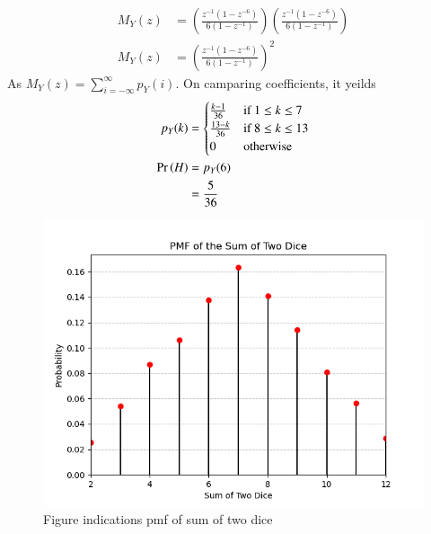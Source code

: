 \documentclass[journal,12pt,twocolumn]{IEEEtran}
\theoremstyle{remark}
\begin{document}
\begin{enumerate}
\begin{align}
M_Y(z)&= \left( \frac{z^{-1}(1-z^{-6})}{6(1-z^{-1})} \right) \left( \frac{z^{-1}(1-z^{-6})}{6(1-z^{-1})} \right)\\
M_Y(z)&=\left( \frac{z^{-1}(1-z^{-6})}{6(1-z^{-1})} \right) ^ 2
 \end{align}
As $M_Y(z)=\sum_{i=-\infty}^\infty p_Y(i)$. On camparing coefficients, it yeilds
\begin{align}
p_Y(k)&=\begin{cases}
            \frac{k-1}{36} & \text{if }1 \leq k \leq 7\\
            \frac{13-k}{36} & \text{if }8 \leq k \leq 13\\
            0 & \text{otherwise}
        \end{cases}\label{eq:3}\\
\Pr\left(H\right)&=p_Y(6)\\
&=\frac{5}{36}
\end{align}
\begin{figure}[!ht]
\centering
\includegraphics[width=\columnwidth]{./figs/figure.png}
\caption{Figure indications pmf of sum of two dice}
\label{fig:11.16.3.17}
\end{figure}  
    \end{enumerate}
    
\end{document}
